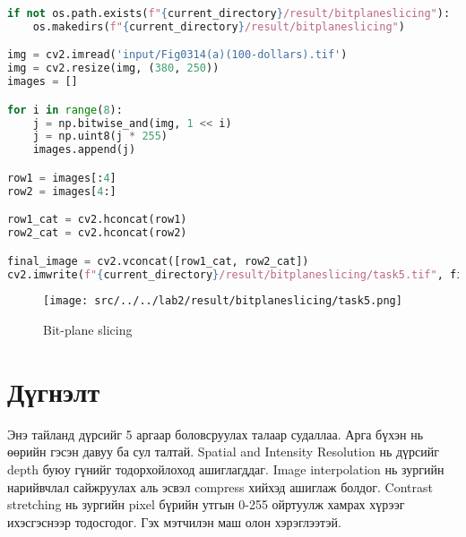 \begin{lstlisting}[language=Python, caption=Bit-plane slicing, frame=single]
	if not os.path.exists(f"{current_directory}/result/bitplaneslicing"):
	os.makedirs(f"{current_directory}/result/bitplaneslicing")

img = cv2.imread('input/Fig0314(a)(100-dollars).tif')
img = cv2.resize(img, (380, 250))
images = []

for i in range(8):
	j = np.bitwise_and(img, 1 << i)
	j = np.uint8(j * 255)
	images.append(j)

row1 = images[:4]
row2 = images[4:]

row1_cat = cv2.hconcat(row1)
row2_cat = cv2.hconcat(row2)

final_image = cv2.vconcat([row1_cat, row2_cat])
cv2.imwrite(f"{current_directory}/result/bitplaneslicing/task5.tif", final_image)
\end{lstlisting}
\begin{figure}
	\centering
	\texttt{[image: src/../../lab2/result/bitplaneslicing/task5.png]}
	\caption{Bit-plane slicing}
\end{figure}

\section{Дүгнэлт}
Энэ тайланд дүрсийг 5 аргаар боловсруулах талаар судаллаа. Арга бүхэн нь өөрийн гэсэн давуу ба сул талтай.
Spatial and Intensity Resolution нь дүрсийг depth буюу гүнийг тодорхойлоход ашиглагддаг.
Image interpolation нь зургийн нарийвчлал сайжруулах аль эсвэл compress хийхэд ашиглаж болдог.
Contrast stretching нь зургийн pixel бүрийн утгын 0-255 ойртуулж хамрах хүрээг ихэсгэснээр тодосгодог.
Гэх мэтчилэн маш олон хэрэглээтэй.
